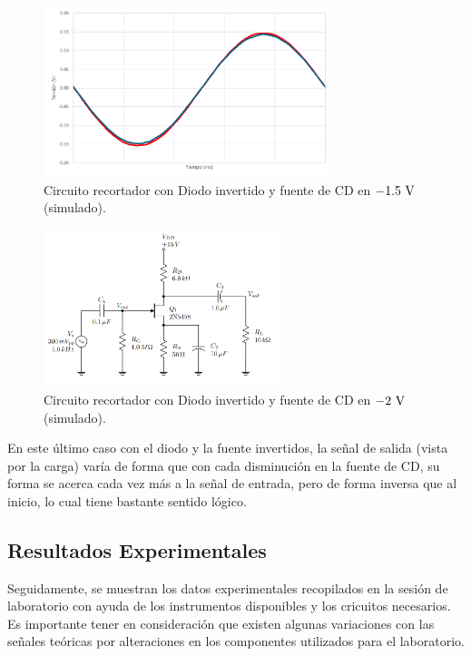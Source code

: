 \documentclass[journal]{IEEEtran}
\begin{document}
\begin{figure}[H]
        \centering
        \includegraphics[width=3.3in]{2C2222.png}
        \caption{Circuito recortador con Diodo invertido y fuente de CD en $-1.5~\textnormal{V}$ (simulado).}
        \label{fig:SignalSimulated_18}
\end{figure}
\begin{figure}[H]
        \centering
        \includegraphics[width=2.7in]{Circ1.png}
        \caption{Circuito recortador con Diodo invertido y fuente de CD en $-2~\textnormal{V}$ (simulado).}
        \label{fig:SignalSimulated_19}
\end{figure}

En este último caso con el diodo y la fuente invertidos, la señal de salida (vista por la carga) varía de forma que con cada disminución en la fuente de CD, su forma 
se acerca cada vez más a la señal de entrada, pero de forma inversa que al inicio, lo cual tiene bastante sentido lógico. 


\subsection{Resultados Experimentales}

Seguidamente, se muestran los datos experimentales recopilados en la sesión de laboratorio con ayuda de los instrumentos disponibles y los cricuitos necesarios.
Es importante tener en consideración que existen algunas variaciones con las señales teóricas por alteraciones en los componentes utilizados para el laboratorio.
\end{document}
